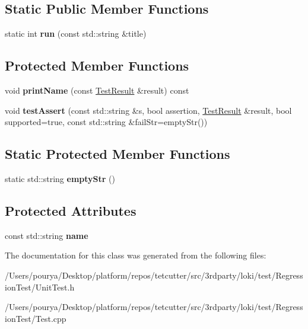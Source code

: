 \subsection*{Static Public Member Functions}
\begin{DoxyCompactItemize}
\item 
\hypertarget{classTest_a37074fc060fd0c41c70812885b99dd5e}{}static int {\bfseries run} (const std\+::string \&title)\label{classTest_a37074fc060fd0c41c70812885b99dd5e}

\end{DoxyCompactItemize}
\subsection*{Protected Member Functions}
\begin{DoxyCompactItemize}
\item 
\hypertarget{classTest_ab23374a2563a3c3b19013c4090b06cf0}{}void {\bfseries print\+Name} (const \hyperlink{classTestResult}{Test\+Result} \&result) const \label{classTest_ab23374a2563a3c3b19013c4090b06cf0}

\item 
\hypertarget{classTest_ae7ec0167c0dcfba4c692bff1ccfa988b}{}void {\bfseries test\+Assert} (const std\+::string \&s, bool assertion, \hyperlink{classTestResult}{Test\+Result} \&result, bool supported=true, const std\+::string \&fail\+Str=empty\+Str())\label{classTest_ae7ec0167c0dcfba4c692bff1ccfa988b}

\end{DoxyCompactItemize}
\subsection*{Static Protected Member Functions}
\begin{DoxyCompactItemize}
\item 
\hypertarget{classTest_a07d06875e492a84f01ea188479c7c6a2}{}static std\+::string {\bfseries empty\+Str} ()\label{classTest_a07d06875e492a84f01ea188479c7c6a2}

\end{DoxyCompactItemize}
\subsection*{Protected Attributes}
\begin{DoxyCompactItemize}
\item 
\hypertarget{classTest_a86ea5f568d97e130d09115afa353f85a}{}const std\+::string {\bfseries name}\label{classTest_a86ea5f568d97e130d09115afa353f85a}

\end{DoxyCompactItemize}


The documentation for this class was generated from the following files\+:\begin{DoxyCompactItemize}
\item 
/\+Users/pourya/\+Desktop/platform/repos/tetcutter/src/3rdparty/loki/test/\+Regression\+Test/Unit\+Test.\+h\item 
/\+Users/pourya/\+Desktop/platform/repos/tetcutter/src/3rdparty/loki/test/\+Regression\+Test/Test.\+cpp\end{DoxyCompactItemize}
